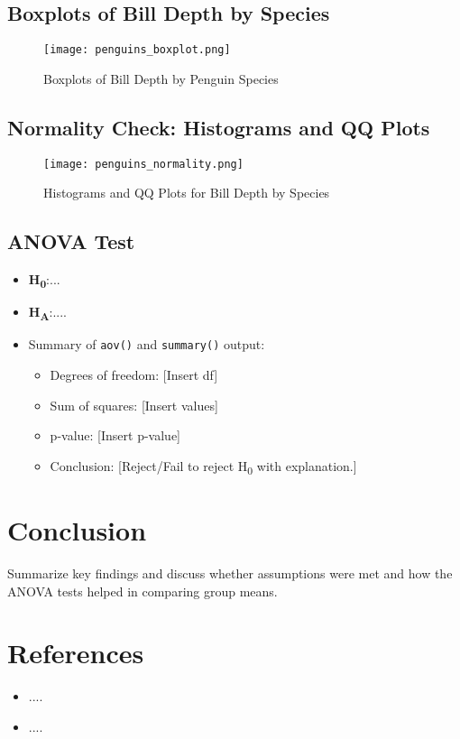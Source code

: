 \documentclass{article}
\begin{document}
\subsection{Boxplots of Bill Depth by Species}
\begin{figure}[H]
    \centering
    \texttt{[image: penguins\_boxplot.png]} %
    \caption{Boxplots of Bill Depth by Penguin Species}
    \label{fig:peng_box}
\end{figure}

\subsection{Normality Check: Histograms and QQ Plots}
\begin{figure}[H]
    \centering
    \texttt{[image: penguins\_normality.png]} %
    \caption{Histograms and QQ Plots for Bill Depth by Species}
    \label{fig:peng_norm}
\end{figure}

\subsection{ANOVA Test}
\begin{itemize}
    \item \textbf{H\textsubscript{0}}:...
    \item \textbf{H\textsubscript{A}}:....
    \item Summary of \texttt{aov()} and \texttt{summary()} output:
    \begin{itemize}
        \item Degrees of freedom: [Insert df]
        \item Sum of squares: [Insert values]
        \item p-value: [Insert p-value]
        \item Conclusion: [Reject/Fail to reject H\textsubscript{0} with explanation.]
    \end{itemize}
\end{itemize}

\section{Conclusion}
Summarize key findings and discuss whether assumptions were met and how the ANOVA tests helped in comparing group means.

\section{References}
\begin{itemize}
    \item ....
    \item ....
\end{itemize}
\end{document}
